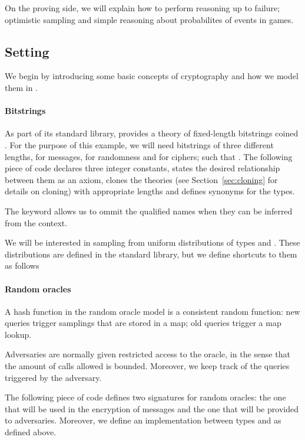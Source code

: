 On the proving side, we will explain how to perform reasoning up to
failure; optimistic sampling and simple reasoning about probabilites
of events in games.

\subsection{Setting}
We begin by introducing some basic concepts of cryptography and how we
model them in \EC.

\paragraph{Bitstrings}
As part of its standard library, \EC provides a theory of fixed-length
bitstrings coined . For the purpose of this example, we will
need bitstrings of three different lengths,  for messages,
 for randomness and  for ciphers; such that . The following piece of code declares three integer constants,
states the desired relationship between them as an axiom, clones the
theories (see Section~\ref{sec:cloning} for details on cloning) with
appropriate lengths and defines synonyms for the types.


The  keyword allows us to ommit the qualified names when
they can be inferred from the context. 

We will be interested in sampling from uniform distributions of types
 and . These distributions are defined in
the standard library, but we define shortcuts to them as follows



\paragraph{Random oracles}
A hash function in the random oracle model is a consistent random
function: new queries trigger samplings that are stored in a map; old
queries trigger a map lookup. 

Adversaries are normally given restricted access to the oracle, in the
sense that the amount of calls allowed is bounded. Moreover, we keep
track of the queries triggered by the adversary. 

The following piece of code defines two signatures for random oracles:
the one that will be used in the encryption of messages and the one
that will be provided to adversaries. Moreover, we define an
implementation between types  and  as
defined above.

